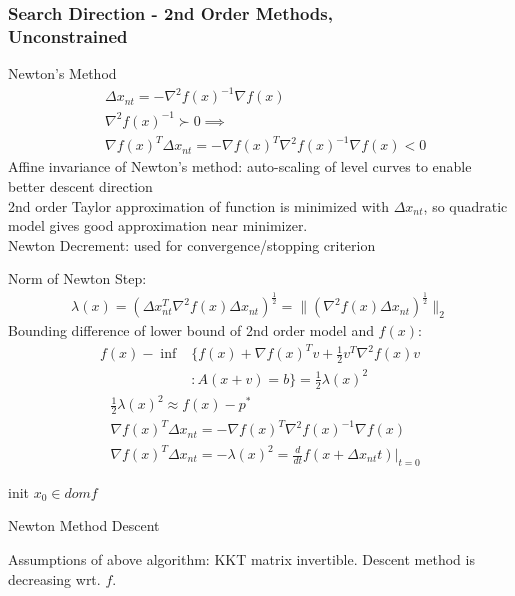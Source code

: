 \message{ !name(notebook.tex)}\documentclass[8pt]{report}
\newcommand{\norm}[1]{\|#1\|}
\begin{document}
\begin{multicols*}{2}
  \subsubsection{Search Direction - 2nd Order Methods,\\ Unconstrained}
  Newton's Method
  \begin{align*}
    &\Delta x_{nt} = - \nabla^2 f(x)^{-1} \nabla f(x)\\
    &\nabla^2 f(x)^{-1} \succ 0 \implies\\
    &\nabla f(x)^T \Delta x_{nt} = - \nabla f(x)^T \nabla^2 f(x)^{-1} \nabla f(x) < 0
  \end{align*}
  Affine invariance of Newton's method: auto-scaling of level curves to enable better descent direction\\
  
  2nd order Taylor approximation of function is minimized with $\Delta x_{nt}$, so quadratic model gives good approximation near minimizer.\\

  Newton Decrement: used for convergence/stopping criterion
  
  Norm of Newton Step:
  \begin{align*}
    \lambda(x) = (\Delta x_{nt}^T \nabla^2 f(x) \Delta x_{nt})^{\frac{1}{2}} = \norm{(\nabla^2 f(x) \Delta x_{nt})^{\frac{1}{2}}}_2
  \end{align*}
  Bounding difference of lower bound of 2nd order model and $f(x)$:
  \begin{align*}
    f(x) - \inf & \{ f(x) + \nabla f(x)^T v + \frac{1}{2} v^T \nabla^2 f(x) v\\
                &: A(x+v) = b \} = \frac{1}{2} \lambda(x)^2
  \end{align*}
  \begin{align*}
    &\frac{1}{2}\lambda(x)^2 \approx f(x) -p^*\\
    &\nabla f(x)^T \Delta x_{nt} = - \nabla f(x)^T \nabla^2 f(x)^{-1} \nabla f(x)\\
    &\nabla f(x)^T \Delta x_{nt} = -\lambda(x)^2 = \frac{d}{dt}f(x+\Delta x_{nt}t)|_{t=0}
  \end{align*}
  
  \begin{algorithm}[H]
    init $x_0 \in dom f$\;
    \caption{Newton Method Descent\label{NewtonMethod}}
  \end{algorithm}
  Assumptions of above algorithm: KKT matrix invertible. Descent method is decreasing wrt. $f$.\\
  

\end{multicols*}
\end{document}
